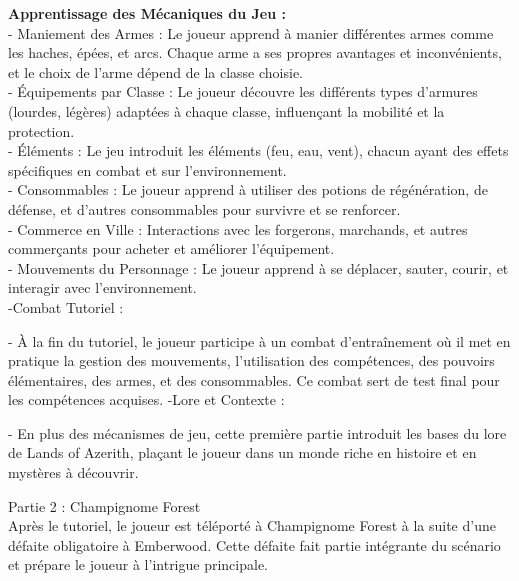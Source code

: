   \textbf{Apprentissage des Mécaniques du Jeu : }
  \\
  
  - Maniement des Armes : Le joueur apprend à manier différentes armes comme les haches, épées, et arcs. Chaque arme a ses propres avantages et inconvénients, et le choix de l'arme dépend de la classe choisie. 
\\

  - Équipements par Classe : Le joueur découvre les différents types d'armures (lourdes, légères) adaptées à chaque classe, influençant la mobilité et la protection. 
\\

  - Éléments : Le jeu introduit les éléments (feu, eau, vent), chacun ayant des effets spécifiques en combat et sur l'environnement. 
\\

  - Consommables : Le joueur apprend à utiliser des potions de régénération, de défense, et d'autres consommables pour survivre et se renforcer. 
\\

  - Commerce en Ville : Interactions avec les forgerons, marchands, et autres commerçants pour acheter et améliorer l'équipement. 
\\

  -  Mouvements du Personnage : Le joueur apprend à se déplacer, sauter, courir, et interagir avec l'environnement. 
  \\

-Combat Tutoriel : 

  - À la fin du tutoriel, le joueur participe à un combat d'entraînement où il met en pratique la gestion des mouvements, l'utilisation des compétences, des pouvoirs élémentaires, des armes, et des consommables. Ce combat sert de test final pour les compétences acquises. 
-Lore et Contexte :

  - En plus des mécanismes de jeu, cette première partie introduit les bases du lore de Lands of Azerith, plaçant le joueur dans un monde riche en histoire et en mystères à découvrir. 



Partie 2 : Champignome Forest 
\\
 

Après le tutoriel, le joueur est téléporté à Champignome Forest à la suite d'une défaite obligatoire à Emberwood. Cette défaite fait partie intégrante du scénario et prépare le joueur à l'intrigue principale. 

  

